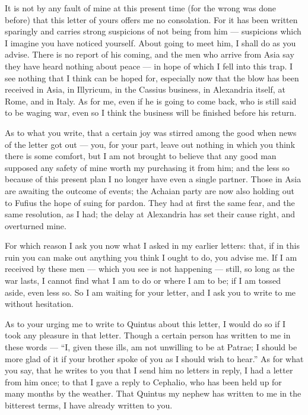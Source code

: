 

 It is not by any fault of mine at this present time (for the wrong was done before) that this letter of yours offers me no consolation. For it has been written sparingly and carries strong suspicions of not being from him --- suspicions which I imagine you have noticed yourself. About going to meet him, I shall do as you advise. There is no report of his coming, and the men who arrive from Asia say they have heard nothing about peace --- in hope of which I fell into this trap. I see nothing that I think can be hoped for, especially now that the blow has been received in Asia, in Illyricum, in the Cassius business, in Alexandria itself, at Rome, and in Italy. As for me, even if he is going to come back, who is still said to be waging war, even so I think the business will be finished before his return.

 As to what you write, that a certain joy was stirred among the good when news of the letter got out --- you, for your part, leave out nothing in which you think there is some comfort, but I am not brought to believe that any good man supposed any safety of mine worth my purchasing it from him; and the less so because of this present plan I no longer have even a single partner. Those in Asia are awaiting the outcome of events; the Achaian party are now also holding out to Fufius the hope of suing for pardon. They had at first the same fear, and the same resolution, as I had; the delay at Alexandria has set their cause right, and overturned mine.

 For which reason I ask you now what I asked in my earlier letters: that, if in this ruin you can make out anything you think I ought to do, you advise me. If I am received by these men --- which you see is not happening --- still, so long as the war lasts, I cannot find what I am to do or where I am to be; if I am tossed aside, even less so. So I am waiting for your letter, and I ask you to write to me without hesitation.

 As to your urging me to write to Quintus about this letter, I would do so if I took any pleasure in that letter. Though a certain person has written to me in these words --- ``I, given these ills, am not unwilling to be at Patrae; I should be more glad of it if your brother spoke of you as I should wish to hear.'' As for what you say, that he writes to you that I send him no letters in reply, I had a letter from him once; to that I gave a reply to Cephalio, who has been held up for many months by the weather. That Quintus my nephew has written to me in the bitterest terms, I have already written to you.

